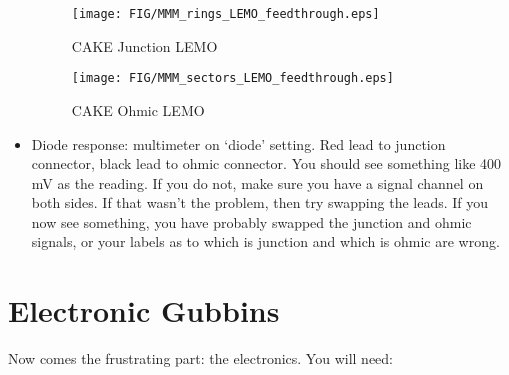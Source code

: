 \documentclass[11pt]{report}
\begin{document}
\begin{itemize}
\begin{figure}
\centering
 \texttt{[image: FIG/MMM\_rings\_LEMO\_feedthrough.eps]}
 \caption{CAKE Junction LEMO}
 \label{fig:CAKE_junction_LEMO}
\end{figure}

\begin{figure}
 \centering
 \texttt{[image: FIG/MMM\_sectors\_LEMO\_feedthrough.eps]}
 \caption{CAKE Ohmic LEMO}
 \label{fig:CAKE_ohmic_LEMO}
\end{figure}

\item Diode response: multimeter on ‘diode’ setting. Red lead to junction connector, black lead to ohmic connector. You should see something like 400 mV as the reading. If you do not, make sure you have a signal channel on both sides. If that wasn’t the problem, then try swapping the leads. If you now see something, you have probably swapped the junction and ohmic signals, or your labels as to which is junction and which is ohmic are wrong.

\end{itemize}


\section{Electronic Gubbins}

Now comes the frustrating part: the electronics. You will need:
\end{document}
